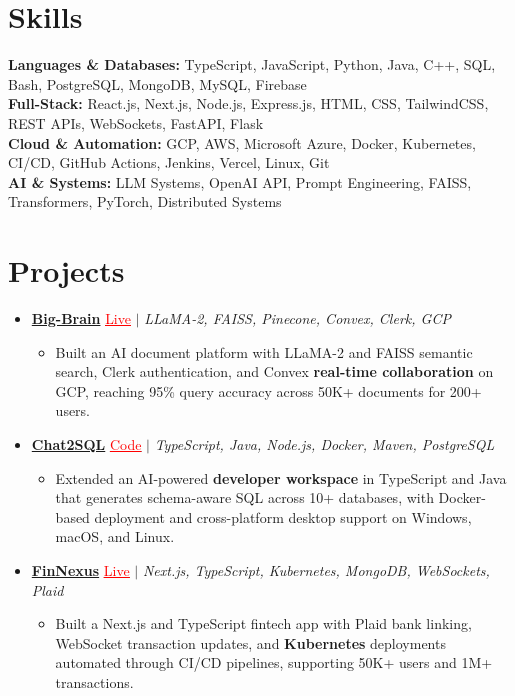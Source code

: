 \documentclass[letterpaper,10pt]{article}
\newcommand{\itemTail}{\vspace{-4pt}}
\newcommand{\sectionGap}{\vspace{-8pt}}
\newcommand{\projGap}{\vspace{3pt}}
\newcommand{\resumeItem}[1]{\item\small{{#1 \itemTail}}}
\newcommand{\resumeProjectHeading}[1]{\item \small #1 \vspace{-2pt}}
\newcommand{\resumeProjectLink}[2]{\href{#1}{\textcolor{red}{\underline{#2}}}}
\newcommand{\resumeSubHeadingListStart}{\begin{itemize}[leftmargin=0.0in, label={}]}
\newcommand{\resumeSubHeadingListEnd}{\end{itemize}}
\newcommand{\resumeProjItemListStart}{\begin{itemize}[leftmargin=0.15in,label=\textbullet,itemsep=3pt,topsep=0pt,parsep=0pt,partopsep=0pt]}
\newcommand{\resumeProjItemListEnd}{\end{itemize}\vspace{-4pt}}
\begin{document}
\section{Skills}
\begin{itemize}[leftmargin=0.15in, label={}]
\small{\item{
\textbf{Languages \& Databases:} TypeScript, JavaScript, Python, Java, C++, SQL, Bash, PostgreSQL, MongoDB, MySQL, Firebase \\
\textbf{Full-Stack:} React.js, Next.js, Node.js, Express.js, HTML, CSS, TailwindCSS, REST APIs, WebSockets, FastAPI, Flask \\
\textbf{Cloud \& Automation:} GCP, AWS, Microsoft Azure, Docker, Kubernetes, CI/CD, GitHub Actions, Jenkins, Vercel, Linux, Git \\
\textbf{AI \& Systems:} LLM Systems, OpenAI API, Prompt Engineering, FAISS, Transformers, PyTorch, Distributed Systems
}}
\end{itemize}
\sectionGap
\section{Projects}
\resumeSubHeadingListStart
\vspace{-2pt}
\resumeProjectHeading{\href{https://big-brain-pied.vercel.app/}{\textbf{Big-Brain}} \resumeProjectLink{https://big-brain-pied.vercel.app/}{Live} $|$ \emph{LLaMA-2, FAISS, Pinecone, Convex, Clerk, GCP}}
\resumeProjItemListStart
\resumeItem{Built an AI document platform with LLaMA-2 and FAISS semantic search, Clerk authentication, and Convex \textbf{real-time collaboration} on GCP, reaching 95\% query accuracy across 50K+ documents for 200+ users.}
\resumeProjItemListEnd
\projGap
\resumeProjectHeading{\href{https://github.com/SAHAJ-BHADJA/Chat2SQL}{\textbf{Chat2SQL}} \resumeProjectLink{https://github.com/SAHAJ-BHADJA/Chat2SQL}{Code} $|$ \emph{TypeScript, Java, Node.js, Docker, Maven, PostgreSQL}}
\resumeProjItemListStart
\resumeItem{Extended an AI-powered \textbf{developer workspace} in TypeScript and Java that generates schema-aware SQL across 10+ databases, with Docker-based deployment and cross-platform desktop support on Windows, macOS, and Linux.}
\resumeProjItemListEnd
\projGap
\resumeProjectHeading{\href{https://fin-nexus.vercel.app/}{\textbf{FinNexus}} \resumeProjectLink{https://fin-nexus.vercel.app/}{Live} $|$ \emph{Next.js, TypeScript, Kubernetes, MongoDB, WebSockets, Plaid}}
\resumeProjItemListStart
\resumeItem{Built a Next.js and TypeScript fintech app with Plaid bank linking, WebSocket transaction updates, and \textbf{Kubernetes} deployments automated through CI/CD pipelines, supporting 50K+ users and 1M+ transactions.}
\resumeProjItemListEnd
\resumeSubHeadingListEnd
\end{document}
